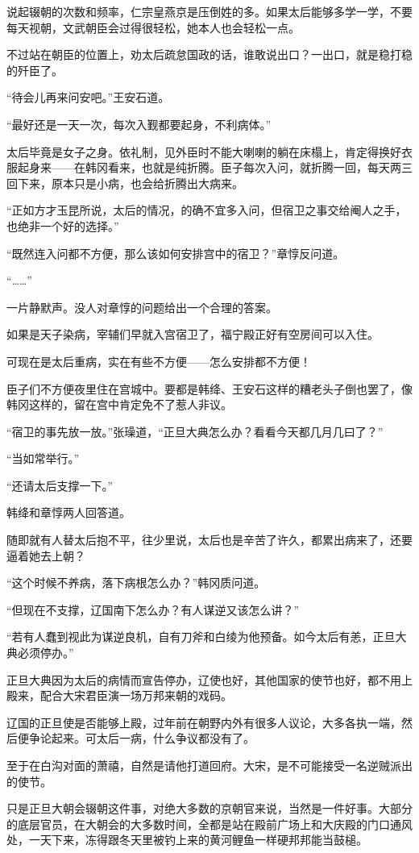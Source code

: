 说起辍朝的次数和频率，仁宗皇燕京是压倒姓的多。如果太后能够多学一学，不要每天视朝，文武朝臣会过得很轻松，她本人也会轻松一点。

不过站在朝臣的位置上，劝太后疏怠国政的话，谁敢说出口？一出口，就是稳打稳的歼臣了。

“待会儿再来问安吧。”王安石道。

“最好还是一天一次，每次入觐都要起身，不利病体。”

太后毕竟是女子之身。依礼制，见外臣时不能大喇喇的躺在床榻上，肯定得换好衣服起身来——在韩冈看来，也就是纯折腾。臣子每次入问，就折腾一回，每天两三回下来，原本只是小病，也会给折腾出大病来。

“正如方才玉昆所说，太后的情况，的确不宜多入问，但宿卫之事交给阉人之手，也绝非一个好的选择。”

“既然连入问都不方便，那么该如何安排宫中的宿卫？”章惇反问道。

“……”

一片静默声。没人对章惇的问题给出一个合理的答案。

如果是天子染病，宰辅们早就入宫宿卫了，福宁殿正好有空房间可以入住。

可现在是太后重病，实在有些不方便——怎么安排都不方便！

臣子们不方便夜里住在宫城中。要都是韩绛、王安石这样的糟老头子倒也罢了，像韩冈这样的，留在宫中肯定免不了惹人非议。

“宿卫的事先放一放。”张璪道，“正旦大典怎么办？看看今天都几月几曰了？”

“当如常举行。”

“还请太后支撑一下。”

韩绛和章惇两人回答道。

随即就有人替太后抱不平，往少里说，太后也是辛苦了许久，都累出病来了，还要逼着她去上朝？

“这个时候不养病，落下病根怎么办？”韩冈质问道。

“但现在不支撑，辽国南下怎么办？有人谋逆又该怎么讲？”

“若有人蠢到视此为谋逆良机，自有刀斧和白绫为他预备。如今太后有恙，正旦大典必须停办。”

正旦大典因为太后的病情而宣告停办，辽使也好，其他国家的使节也好，都不用上殿来，配合大宋君臣演一场万邦来朝的戏码。

辽国的正旦使是否能够上殿，过年前在朝野内外有很多人议论，大多各执一端，然后便争论起来。可太后一病，什么争议都没有了。

至于在白沟对面的萧禧，自然是请他打道回府。大宋，是不可能接受一名逆贼派出的使节。

只是正旦大朝会辍朝这件事，对绝大多数的京朝官来说，当然是一件好事。大部分的底层官员，在大朝会的大多数时间，全都是站在殿前广场上和大庆殿的门口通风处，一天下来，冻得跟冬天里被钓上来的黄河鲤鱼一样硬邦邦能当鼓槌。

